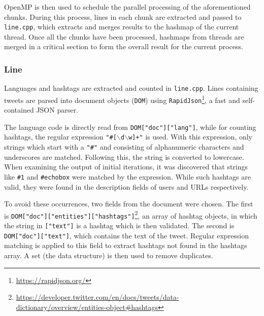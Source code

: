\documentclass[10pt]{article}
\begin{document}
OpenMP is then used to schedule the parallel processing of the aforementioned chunks. 
During this process, lines in each chunk are extracted and passed to \texttt{line.cpp}, 
which extracts and merges results to the hashmap of the current thread. 
Once all the chunks have been processed, hashmaps from threads are merged in a critical section to form the overall result for the current process.

\subsubsection{Line}
Languages and hashtags are extracted and counted in \texttt{line.cpp}. 
Lines containing tweets are parsed into document objects (\texttt{DOM}) using  \texttt{RapidJson}\footnote{\url{https://rapidjson.org/}}, 
a fast and self-contained JSON parser. 

The language code is directly read from \texttt{DOM["doc"]["lang"]}, while for counting hashtags, the regular expression \texttt{"\#[$\backslash$d$\backslash$w]+"} is used. With this expression, only strings which start with a \texttt{"\#"} and consisting of alphanumeric characters and underscores are matched. Following this, the string is converted to lowercase.
When examining the output of initial iterations, it was discovered that strings like \texttt{\#1} and \texttt{\#echobox} were matched by the expression. 
While such hashtags are valid, they were found in the description fields of users and URLs respectively. 

To avoid these occurrences, two fields from the document were chosen. The first is \texttt{DOM["doc"]["entities"]["hashtags"]}\footnote{\url{https://developer.twitter.com/en/docs/tweets/data-dictionary/overview/entities-object\#hashtags}}, an array of hashtag objects, in which the string in \texttt{["text"]} is a hashtag which is then validated. %
The second is \texttt{DOM["doc"]["text"]}, which contains the text of the tweet. Regular expression matching is applied to this field to extract hashtags not found in the hashtags array. 
A set (the data structure) is then used to remove duplicates. 

\end{document}
